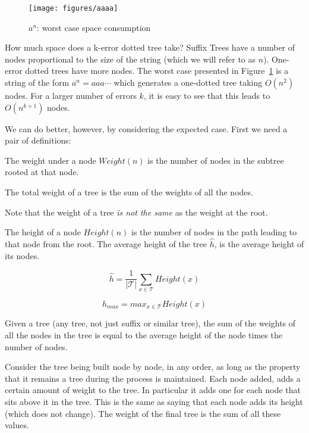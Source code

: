 \begin{figure}
\texttt{[image: figures/aaaa]}
\caption{$a^n$: worst case space consumption}%
\label{fig:aaaa}
\end{figure}

How much space does a k-error dotted tree take? Suffix Trees have a number of nodes proportional to the size of the string (which we will refer to as $n$). One-error dotted trees have more nodes. The worst case presented in Figure~\ref{fig:aaaa} is a string of the form $a^n = aaa\cdots$ which generates a one-dotted tree taking $O(n^2)$ nodes. For a larger number of errors $k$, it is easy to see that this leads to $O(n^{k+1})$ nodes.

We can do better, however, by considering the expected case. First we need a pair of definitions:

\begin{definition}
The weight under a node $\mathit{Weight}(n)$ is the number of nodes in the subtree rooted at that node.

The total weight of a tree is the sum of the weights of all the nodes.
\end{definition}

Note that the weight of a tree \emph{is not the same} as the weight at the root.

\begin{definition}
The height of a node $\mathit{Height}(n)$ is the number of nodes in the path leading to that node from the root. The average height of the tree $\hat{h}$, is the average height of its nodes.

\[ \hat{h} = \frac{1}{|\mathcal{T}|} \sum_{x \in \mathit{\mathcal{T}}} \mathit{Height}(x) \]

\[ h_{max} = \mathit{max}_{x \in \mathcal{T}} \mathit{Height}(x) \]

\end{definition}

\begin{lemma}
Given a tree (any tree, not just suffix or similar tree), the sum of the weights of all the nodes in the tree is equal to the average height of the node times the number of nodes.
\end{lemma}

\Proof
Consider the tree being built node by node, in any order, as long as the property that it remains a tree during the process is maintained. Each node added, adds a certain amount of weight to the tree. In particular it adds one for each node that sits above it in the tree. This is the same as saying that each node adds its height (which does not change). The weight of the final tree is the sum of all these values.

